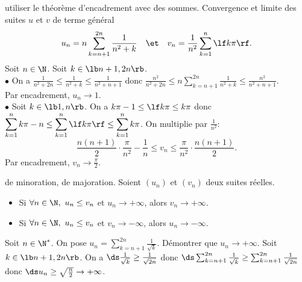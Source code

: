 \documentclass[11pt]{article}
\begin{document}
\begin{ex}{utiliser le théorème d'encadrement avec des sommes.}{}
    Convergence et limite des suites $u$ et $v$ de terme général
    \begin{equation*}
        u_n = n\sum_{k=n+1}^{2n}\frac{1}{n^2+k} \quad\et\quad v_n=\frac{1}{n^2}\sum_{k=1}^n\lf k\pi \rf.
    \end{equation*}
    \tcblower
    Soit $n\in\N$. Soit $k\in \lb n+1,2n\rb$.\\
    $\bullet$ On a $\displaystyle\frac{1}{n^2+2n}\leq\frac{1}{n^2+k}\leq\frac{1}{n^2+n+1}$ donc $\displaystyle\frac{n^2}{n^2+2n}\leq n\sum_{k=n+1}^{2n}\frac{1}{n^2+k}\leq\frac{n^2}{n^2+n+1}$.\\
    Par encadrement, $u_n\to1$.\\
    $\bullet$ Soit $k\in \lb1,n\rb$. On a $k\pi-1\leq\lf k\pi \leq k\pi$ donc $\displaystyle\sum_{k=1}^nk\pi-n\leq\sum_{k=1}^n\lf k\pi \rf \leq \sum_{k=1}^nk\pi$. On multiplie par $\frac{1}{n^2}$:
    \begin{equation*}
        \frac{n(n+1)}{2}\cdot\frac{\pi}{n^2}-\frac{1}{n} \leq v_n \leq \frac{\pi}{n^2}\cdot\frac{n(n+1)}{2}.
    \end{equation*}
    Par encadrement, $v_n\to \frac{\pi}{2}$.
\end{ex}

\begin{prop}{de minoration, de majoration.}{}
    Soient $(u_n)$ et $(v_n)$ deux suites réelles.
    \begin{itemize}
        \item Si $\forall n\in \N, ~ u_n \leq v_n$ et $u_n\to+\infty$, alors $v_n\to+\infty$.
        \item Si $\forall n\in \N, ~ u_n \leq v_n$ et $v_n\to-\infty$, alors $u_n\to-\infty$.
    \end{itemize}
\end{prop}

\begin{ex}{}{}
    Soit $n\in\N^*$. On pose $\displaystyle u_n=\sum_{k=n+1}^{2n}\frac{1}{\sqrt{k}}$. Démontrer que $u_n\to+\infty$.
    \tcblower
    Soit $k\in\lb n+1, 2n \rb$. On a $\ds\frac{1}{\sqrt{k}}\geq\frac{1}{\sqrt{2n}}$ donc $\ds\sum_{k=n+1}^{2n}\frac{1}{\sqrt{k}}\geq\sum_{k=n+1}^{2n}\frac{1}{\sqrt{2n}}$ donc $\ds u_n\geq\sqrt{\frac{n}{2}}\to+\infty$.
\end{ex}

\pagebreak
\end{document}
